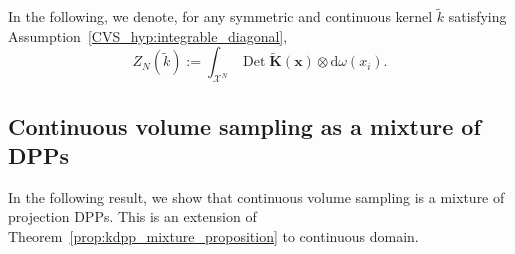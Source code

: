 \documentclass[twoside,11pt]{book}
\newtheorem{definition}{Definition}
\numberwithin{theorem}{chapter}
\numberwithin{definition}{chapter}
\numberwithin{proposition}{chapter}
\numberwithin{corollary}{chapter}
\numberwithin{example}{chapter}
\numberwithin{lemma}{chapter}
\numberwithin{assumption}{chapter}
\numberwithin{equation}{chapter}
\numberwithin{figure}{chapter}
\DeclareMathOperator{\Det}{Det}
\DeclareMathOperator{\DPP}{\mathrm{DPP}}
\DeclareMathOperator{\Prb}{\mathbb{P}}
\DeclareMathOperator*{\KDPP}{\mathfrak{K}}
\DeclareMathOperator{\X}{\mathcal{X}}
\newcommand{\rb}[1]{\textcolor{magenta}{#1}}
\begin{document}
In the following, we denote, for any symmetric and continuous kernel $\tilde{k}$ satisfying Assumption~\ref{CVS_hyp:integrable_diagonal},
\begin{equation}
Z_{N}(\tilde{k}) := \int_{\X^{N}} \Det \bm{\tilde{K}}(\bm{x}) \otimes\mathrm{d}\omega(x_{i}).
\end{equation}



\subsection{Continuous volume sampling as a mixture of DPPs}



In the following result, we show that continuous volume sampling is a mixture of projection DPPs. This is an extension of Theorem~\ref{prop:kdpp_mixture_proposition} to continuous domain.

\end{document}
